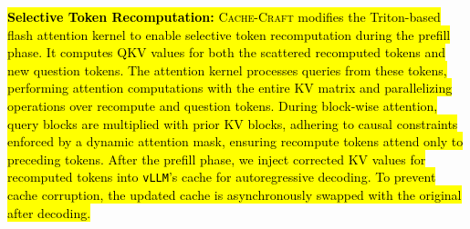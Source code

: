 \noindent \hl{\textbf{Selective Token Recomputation:} \textsc{Cache-Craft} modifies the Triton-based flash attention kernel to enable selective token recomputation during the prefill phase. It computes QKV values for both the scattered recomputed tokens and new question tokens. The attention kernel processes queries from these tokens, performing attention computations with the entire KV matrix and parallelizing operations over recompute and question tokens. During block-wise attention, query blocks are multiplied with prior KV blocks, adhering to causal constraints enforced by a dynamic attention mask, ensuring recompute tokens attend only to preceding tokens. After the prefill phase, we inject corrected KV values for recomputed tokens into \texttt{vLLM}'s cache for autoregressive decoding. To prevent cache corruption, the updated cache is asynchronously swapped with the original after decoding.} 
